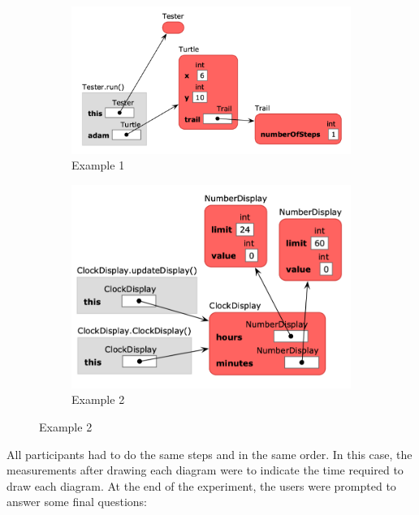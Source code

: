 \documentclass[]{usiinfbachelorproject}
\begin{document}
\begin{figure}[h!]
\centering
\begin{subfigure}{.5\textwidth}
  \centering
  \includegraphics[width=\textwidth-10pt]{figures/informa_clicker_example2.png}
  \caption{Example 1}
  \label{fig:sub1}
\end{subfigure}%
\begin{subfigure}{.5\textwidth}
  \centering
  \includegraphics[width=\textwidth-10pt]{figures/informa_clicker_example4.png}
  \caption{Example 2}
  \label{fig:sub2}
\end{subfigure}
\label{fig:test}
\end{figure}

\bigskip

\noindent All participants had to do the same steps and in the same order. In this case, the measurements after drawing each diagram were to indicate the time required to draw each diagram. At the end of the experiment, the users were prompted to answer some final questions:
\end{document}
